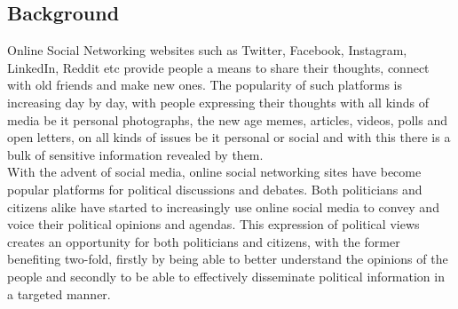 \documentclass[a4paper,11pt]{article}
\begin{document}
\subsection{Background}
Online Social Networking websites such as Twitter, Facebook, Instagram,  LinkedIn, Reddit etc provide people a means to share their thoughts, connect with old friends and make new ones. The popularity of such platforms is increasing day by day, with people expressing their thoughts with all kinds of media be it personal photographs, the new age memes, articles, videos, polls and open letters, on all kinds of issues be it personal or social and with this there is a bulk of sensitive information revealed by them. 
\medskip\\
With the advent of social media, online social networking sites have become popular platforms for political discussions and debates. Both politicians and citizens alike have started to increasingly use online social media to convey and voice their political opinions and agendas. This expression of political views creates an opportunity for both politicians and citizens, with the former benefiting two-fold, firstly by being able to better understand the opinions of the people and secondly to be able to effectively disseminate political information in a targeted manner.
\end{document}
